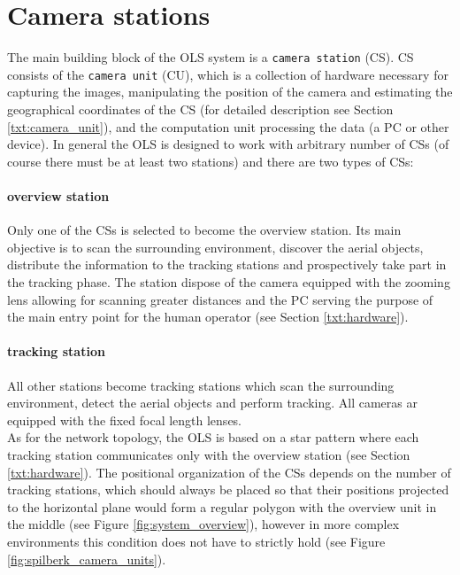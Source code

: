 \section{Camera stations}

The main building block of the OLS system is a \texttt{camera station} (CS). CS consists of the \texttt{camera unit} (CU), which is a collection of hardware necessary for capturing the images, manipulating the position of the camera and estimating the geographical coordinates of the CS (for detailed description see Section \ref{txt:camera_unit}), and the computation unit processing the data (a PC or other device). In general the OLS is designed to work with arbitrary number of CSs (of course there must be at least two stations) and there are two types of CSs:

\paragraph{overview station} Only one of the CSs is selected to become the overview station. Its main objective is to scan the surrounding environment, discover the aerial objects, distribute the information to the tracking stations and prospectively take part in the tracking phase. The station dispose of the camera equipped with the zooming lens allowing for scanning greater distances and the PC serving the purpose of the main entry point for the human operator (see Section \ref{txt:hardware}).

\paragraph{tracking station} All other stations become tracking stations which scan the surrounding environment, detect the aerial objects and perform tracking. All cameras ar equipped with the fixed focal length lenses. \\

As for the network topology, the OLS is based on a star pattern where each tracking station communicates only with the overview station (see Section \ref{txt:hardware}). The positional organization of the CSs depends on the number of tracking stations, which should always be placed so that their positions projected to the horizontal plane would form a regular polygon with the overview unit in the middle (see Figure \ref{fig:system_overview}), however in more complex environments this condition does not have to strictly hold (see Figure \ref{fig:spilberk_camera_units}).
	

